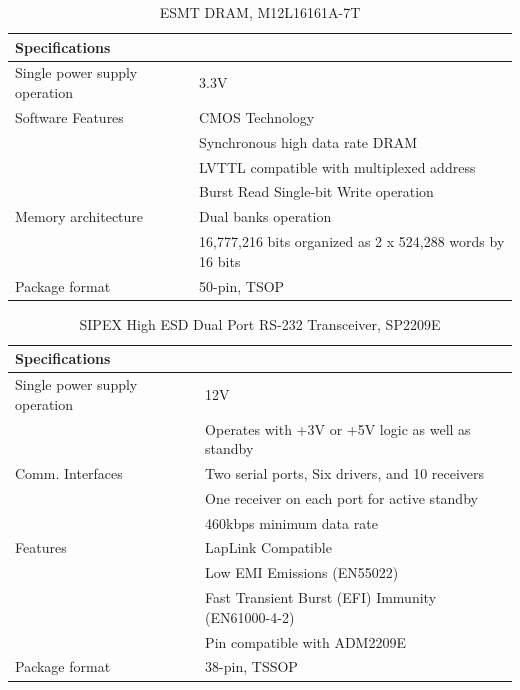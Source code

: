 \begin{table}
    \centering
    \caption{ESMT DRAM, M12L16161A-7T \autocite{alldatasheet.comM12L16161A7TDatasheetPDF}}
    \label{table:M12L16161A-7T}%
    \begin{tabular}{|p{4cm}|p{12cm}|}
      \hline\rowcolor{gray!30}
  
      \textbf{Specifications} &  \\
      \hline
  
      Single power supply operation & 3.3V \\
      \hline
  
      Software Features & CMOS Technology \\
      & Synchronous high data rate DRAM \\
      & LVTTL compatible with multiplexed address \\
      & Burst Read Single-bit Write operation \\
      \hline
  
      Memory architecture & Dual banks operation \\
      & 16,777,216 bits organized as 2 x 524,288 words by 16 bits\\
      \hline
  
      Package format & 50-pin, TSOP \\
      \hline
  
    \end{tabular}
\end{table}

\begin{table}
    \centering
    \caption{SIPEX High ESD Dual Port RS-232 Transceiver, SP2209E \autocite{alldatasheet.comSP2209EDatasheetPDF}}
    \label{table:SP2209E}%
    \begin{tabular}{|p{4cm}|p{12cm}|}
      \hline\rowcolor{gray!30}
  
      \textbf{Specifications} &  \\
      \hline
  
      Single power supply operation & 12V \\
      & Operates with +3V or +5V logic as well as standby \\
      \hline

      Comm. Interfaces & Two serial ports, Six drivers, and 10 receivers \\
      & One receiver on each port for active standby \\
      & 460kbps minimum data rate \\
      \hline

      Features & LapLink Compatible \\
      & Low EMI Emissions (EN55022) \\
      & Fast Transient Burst (EFI) Immunity (EN61000-4-2) \\
      & Pin compatible with ADM2209E \\
      \hline
  
      Package format & 38-pin, TSSOP \\
      \hline
  
    \end{tabular}
\end{table}

